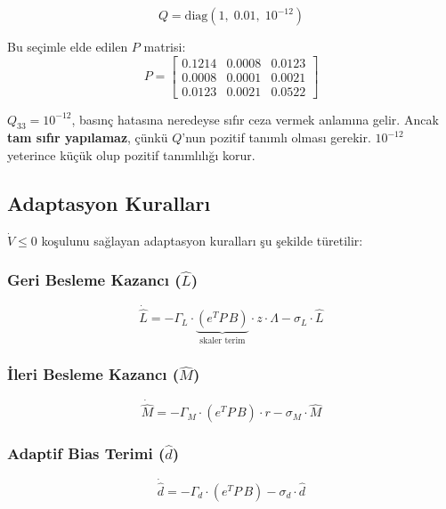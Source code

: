 \documentclass[12pt,a4paper]{article}
\begin{document}
\begin{equation}
    \boxed{Q = \text{diag}\left(1,\; 0.01,\; 10^{-12}\right)}
    \label{eq:Q_final}
\end{equation}

Bu seçimle elde edilen $P$ matrisi:
\begin{equation}
    P = \begin{bmatrix}
        0.1214 & 0.0008 & 0.0123 \\
        0.0008 & 0.0001 & 0.0021 \\
        0.0123 & 0.0021 & 0.0522
    \end{bmatrix}
\end{equation}

\begin{dikkat}[Neden $10^{-12}$?]
$Q_{33} = 10^{-12}$, basınç hatasına neredeyse sıfır ceza vermek anlamına gelir. Ancak \textbf{tam sıfır yapılamaz}, çünkü $Q$'nun pozitif tanımlı olması gerekir. $10^{-12}$ yeterince küçük olup pozitif tanımlılığı korur.
\end{dikkat}

\subsection{Adaptasyon Kuralları}

$\dot{V} \leq 0$ koşulunu sağlayan adaptasyon kuralları şu şekilde türetilir:

\subsubsection{Geri Besleme Kazancı ($\hat{L}$)}
\begin{equation}
    \boxed{\dot{\hat{L}} = -\Gamma_L \cdot \underbrace{\left(e^T P\,B\right)}_{\text{skaler terim}} \cdot z \cdot \Lambda - \sigma_L \cdot \hat{L}}
    \label{eq:L_update}
\end{equation}

\subsubsection{İleri Besleme Kazancı ($\hat{M}$)}
\begin{equation}
    \boxed{\dot{\hat{M}} = -\Gamma_M \cdot \left(e^T P\,B\right) \cdot r - \sigma_M \cdot \hat{M}}
    \label{eq:M_update}
\end{equation}

\subsubsection{Adaptif Bias Terimi ($\hat{d}$)}
\begin{equation}
    \boxed{\dot{\hat{d}} = -\Gamma_d \cdot \left(e^T P\,B\right) - \sigma_d \cdot \hat{d}}
    \label{eq:d_update}
\end{equation}
\end{document}
